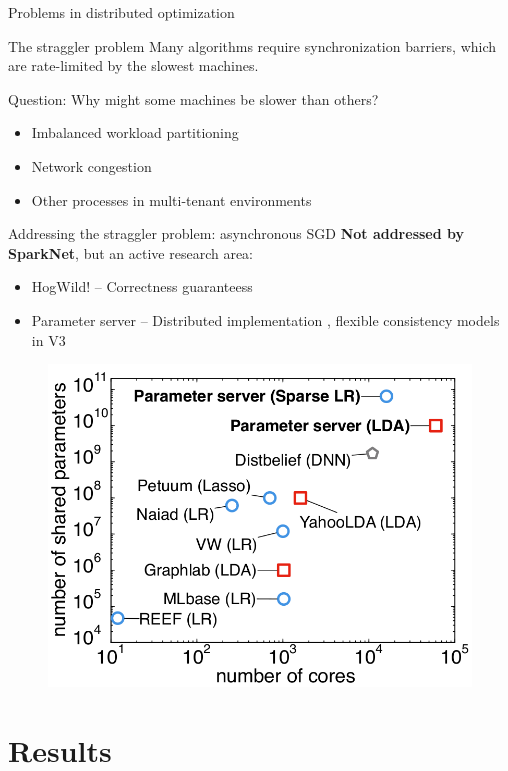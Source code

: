 \documentclass[pdf]{beamer}
\begin{document}
\begin{frame}{Problems in distributed optimization}
    \begin{block}{The straggler problem}
        Many algorithms require synchronization barriers, which are rate-limited
        by the slowest machines.
    \end{block}

    \begin{alertblock}{Question: Why might some machines be slower than others?}
        \pause
        \begin{itemize}
            \item Imbalanced workload partitioning
            \item Network congestion
            \item Other processes in multi-tenant environments
        \end{itemize}
    \end{alertblock}
\end{frame}

\begin{frame}{Addressing the straggler problem: asynchronous SGD}
    \textbf{Not addressed by SparkNet}, but an active research area:
    \begin{itemize}
        \item HogWild! -- Correctness guaranteess \cite{recht2011hogwild}
        \item Parameter server -- Distributed implementation \cite{ho2013more},
            flexible consistency models in V3 \cite{li2013parameter}
    \end{itemize}

    \begin{figure}[htpb]
        \centering
        \includegraphics[width=0.5\linewidth]{Figures/parameter-servers.png}
    \end{figure}
\end{frame}

\section{Results}
\end{document}
